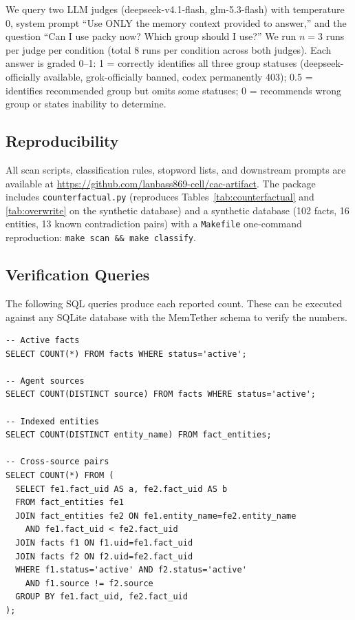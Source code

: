 \documentclass{article}
\begin{document}
We query two LLM judges (deepseek-v4.1-flash, glm-5.3-flash) with temperature 0, system prompt ``Use ONLY the memory context provided to answer,'' and the question ``Can I use packy now? Which group should I use?'' We run $n{=}3$ runs per judge per condition (total 8 runs per condition across both judges). Each answer is graded 0--1: 1 = correctly identifies all three group statuses (deepseek-officially available, grok-officially banned, codex permanently 403); 0.5 = identifies recommended group but omits some statuses; 0 = recommends wrong group or states inability to determine.

\subsection{Reproducibility}
All scan scripts, classification rules, stopword lists, and downstream prompts are available at \url{https://github.com/lanbass869-cell/cac-artifact}. The package includes \texttt{counterfactual.py} (reproduces Tables~\ref{tab:counterfactual} and \ref{tab:overwrite} on the synthetic database) and a synthetic database (102 facts, 16 entities, 13 known contradiction pairs) with a \texttt{Makefile} one-command reproduction: \texttt{make scan \&\& make classify}.

\subsection{Verification Queries}
The following SQL queries produce each reported count. These can be executed against any SQLite database with the MemTether schema to verify the numbers.

\begin{verbatim}
-- Active facts
SELECT COUNT(*) FROM facts WHERE status='active';

-- Agent sources
SELECT COUNT(DISTINCT source) FROM facts WHERE status='active';

-- Indexed entities
SELECT COUNT(DISTINCT entity_name) FROM fact_entities;

-- Cross-source pairs
SELECT COUNT(*) FROM (
  SELECT fe1.fact_uid AS a, fe2.fact_uid AS b
  FROM fact_entities fe1
  JOIN fact_entities fe2 ON fe1.entity_name=fe2.entity_name
    AND fe1.fact_uid < fe2.fact_uid
  JOIN facts f1 ON f1.uid=fe1.fact_uid
  JOIN facts f2 ON f2.uid=fe2.fact_uid
  WHERE f1.status='active' AND f2.status='active'
    AND f1.source != f2.source
  GROUP BY fe1.fact_uid, fe2.fact_uid
);
\end{verbatim}
\end{document}
